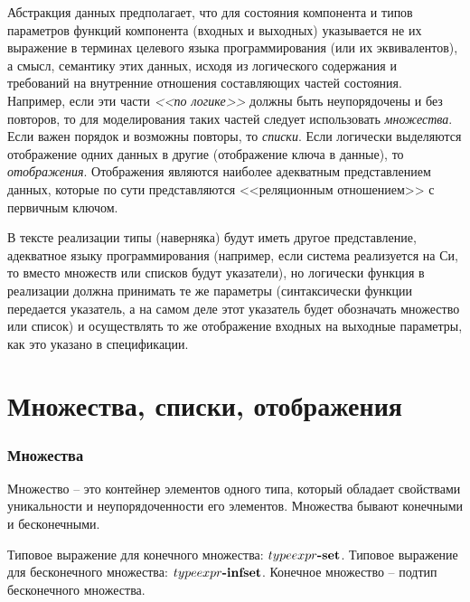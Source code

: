 \documentclass[14pt, twoside]{extreport}
\newcommand{\head}[1]{\vspace{1cm}\subsubsection*{#1}}
\begin{document}
Абстракция данных предполагает, что для состояния компонента и типов параметров функций компонента (входных и выходных) указывается не их выражение в терминах целевого языка программирования (или их эквивалентов), а смысл, семантику этих данных, исходя из логического содержания и требований на внутренние отношения составляющих частей состояния. Например, если эти части \emph{<<по логике>>} должны быть неупорядочены и без повторов, то для моделирования таких частей следует использовать \emph{множества}. Если важен порядок и возможны повторы, то \emph{списки}. Если логически выделяются отображение одних данных в другие (отображение ключа в данные), то \emph{отображения}. Отображения являются наиболее адекватным представлением данных, которые по сути представляются <<реляционным отношением>> с первичным ключом.

В тексте реализации типы (наверняка) будут иметь другое представление, адекватное языку программирования (например, если система реализуется на Си, то вместо множеств или списков будут указатели), но логически функция в реализации должна принимать те же параметры (синтаксически функции передается указатель, а на самом деле этот указатель будет обозначать множество или список) и осуществлять то же отображение входных на выходные параметры, как это указано в спецификации.

\section{Множества, списки, отображения}

\head{Множества}
Множество -- это контейнер элементов одного типа, который обладает свойствами уникальности и неупорядоченности его элементов. Множества бывают конечными и бесконечными.

Типовое выражение для конечного множества: $typeexpr\textbf{-set}$. Типовое выражение для бесконечного множества: $typeexpr\textbf{-infset}$. Конечное множество -- подтип бесконечного множества.
\end{document}
